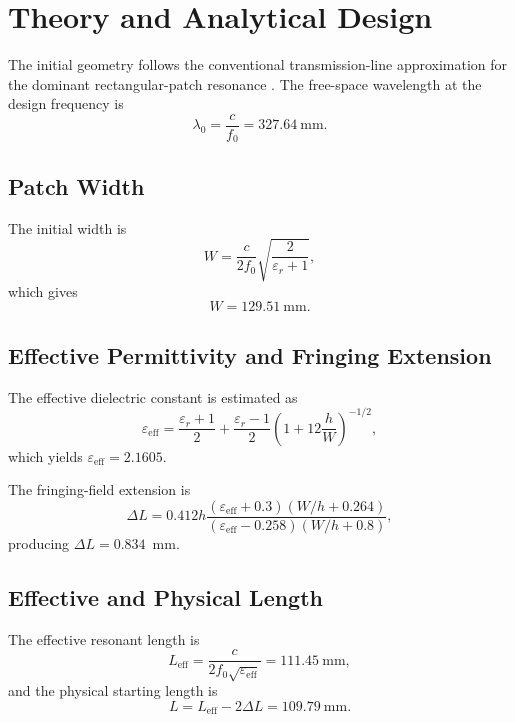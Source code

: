 \section{Theory and Analytical Design}
\label{sec:theory-and-design}

The initial geometry follows the conventional transmission-line approximation for the
dominant rectangular-patch resonance \cite{stutzman2013antenna}. The free-space
wavelength at the design frequency is
\begin{equation}
\lambda_0=\frac{c}{f_0}=327.64~\text{mm}.
\label{eq:lambda0}
\end{equation}

\subsection{Patch Width}

The initial width is
\begin{equation}
W=\frac{c}{2f_0}\sqrt{\frac{2}{\varepsilon_r+1}},
\label{eq:patch-width}
\end{equation}
which gives
\begin{equation}
W=129.51~\text{mm}.
\end{equation}

\subsection{Effective Permittivity and Fringing Extension}

The effective dielectric constant is estimated as
\begin{equation}
\varepsilon_{\mathrm{eff}}
=\frac{\varepsilon_r+1}{2}
+\frac{\varepsilon_r-1}{2}
\left(1+12\frac{h}{W}\right)^{-1/2},
\label{eq:effective-permittivity}
\end{equation}
which yields $\varepsilon_{\mathrm{eff}}=2.1605$.

The fringing-field extension is
\begin{equation}
\Delta L
=0.412h\frac{(\varepsilon_{\mathrm{eff}}+0.3)(W/h+0.264)}
{(\varepsilon_{\mathrm{eff}}-0.258)(W/h+0.8)},
\label{eq:length-extension}
\end{equation}
producing $\Delta L=0.834$~mm.

\subsection{Effective and Physical Length}

The effective resonant length is
\begin{equation}
L_{\mathrm{eff}}=\frac{c}{2f_0\sqrt{\varepsilon_{\mathrm{eff}}}}
=111.45~\text{mm},
\label{eq:effective-length}
\end{equation}
and the physical starting length is
\begin{equation}
L=L_{\mathrm{eff}}-2\Delta L=109.79~\text{mm}.
\label{eq:physical-length}
\end{equation}


